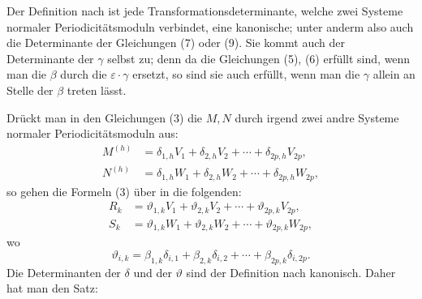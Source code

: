 \documentclass[10pt]{article}
\begin{document}
Der Definition nach ist jede Transformationsdeterminante, welche zwei Systeme normaler Periodicitätsmoduln verbindet, eine kanonische; unter anderm also auch die Determinante der Gleichungen (7) oder (9). Sie kommt auch der Determinante der \(\gamma\) selbst zu; denn da die Gleichungen (5), (6) erfüllt sind, wenn man die \(\beta\) durch die \(\varepsilon\cdot\gamma\) ersetzt, so sind sie auch erfüllt, wenn man die \(\gamma\) allein an Stelle der \(\beta\) treten lässt.

Drückt man in den Gleichungen (3) die \(M,N\) durch irgend zwei andre Systeme normaler Periodicitätsmoduln aus:
\[
\begin{aligned}
M^{(h)}&=\delta_{1,h}V_1+\delta_{2,h}V_2+\cdots+\delta_{2p,h}V_{2p},\\
N^{(h)}&=\delta_{1,h}W_1+\delta_{2,h}W_2+\cdots+\delta_{2p,h}W_{2p},
\end{aligned}
\]
so gehen die Formeln (3) über in die folgenden:
\[
\begin{aligned}
R_k&=\vartheta_{1,k}V_1+\vartheta_{2,k}V_2+\cdots+\vartheta_{2p,k}V_{2p},\\
S_k&=\vartheta_{1,k}W_1+\vartheta_{2,k}W_2+\cdots+\vartheta_{2p,k}W_{2p},
\end{aligned}
\]
wo
\[
\vartheta_{i,k}=\beta_{1,k}\delta_{i,1}+\beta_{2,k}\delta_{i,2}+\cdots+\beta_{2p,k}\delta_{i,2p}.
\]
Die Determinanten der \(\delta\) und der \(\vartheta\) sind der Definition nach kanonisch. Daher hat man den Satz:
\end{document}
